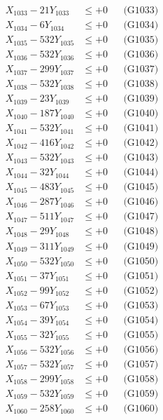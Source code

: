 \documentclass[a4paper,10pt]{article}
\begin{document}
{\begin{align}
X_{1033} - 21Y_{1033} &\leq +0 && \text{(G1033)} \\
X_{1034} - 6Y_{1034} &\leq +0 && \text{(G1034)} \\
X_{1035} - 532Y_{1035} &\leq +0 && \text{(G1035)} \\
X_{1036} - 532Y_{1036} &\leq +0 && \text{(G1036)} \\
X_{1037} - 299Y_{1037} &\leq +0 && \text{(G1037)} \\
X_{1038} - 532Y_{1038} &\leq +0 && \text{(G1038)} \\
X_{1039} - 23Y_{1039} &\leq +0 && \text{(G1039)} \\
X_{1040} - 187Y_{1040} &\leq +0 && \text{(G1040)} \\
\allowbreak
X_{1041} - 532Y_{1041} &\leq +0 && \text{(G1041)} \\
X_{1042} - 416Y_{1042} &\leq +0 && \text{(G1042)} \\
X_{1043} - 532Y_{1043} &\leq +0 && \text{(G1043)} \\
X_{1044} - 32Y_{1044} &\leq +0 && \text{(G1044)} \\
X_{1045} - 483Y_{1045} &\leq +0 && \text{(G1045)} \\
X_{1046} - 287Y_{1046} &\leq +0 && \text{(G1046)} \\
X_{1047} - 511Y_{1047} &\leq +0 && \text{(G1047)} \\
X_{1048} - 29Y_{1048} &\leq +0 && \text{(G1048)} \\
X_{1049} - 311Y_{1049} &\leq +0 && \text{(G1049)} \\
X_{1050} - 532Y_{1050} &\leq +0 && \text{(G1050)} \\
\allowbreak
X_{1051} - 37Y_{1051} &\leq +0 && \text{(G1051)} \\
X_{1052} - 99Y_{1052} &\leq +0 && \text{(G1052)} \\
X_{1053} - 67Y_{1053} &\leq +0 && \text{(G1053)} \\
X_{1054} - 39Y_{1054} &\leq +0 && \text{(G1054)} \\
X_{1055} - 32Y_{1055} &\leq +0 && \text{(G1055)} \\
X_{1056} - 532Y_{1056} &\leq +0 && \text{(G1056)} \\
X_{1057} - 532Y_{1057} &\leq +0 && \text{(G1057)} \\
X_{1058} - 299Y_{1058} &\leq +0 && \text{(G1058)} \\
X_{1059} - 532Y_{1059} &\leq +0 && \text{(G1059)} \\
X_{1060} - 258Y_{1060} &\leq +0 && \text{(G1060)} \\

\end{align}}
\end{document}
